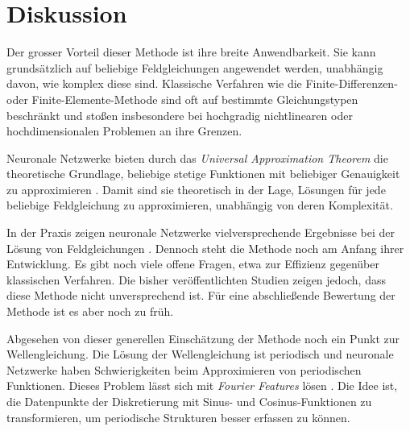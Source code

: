 %
%
%
%

\section{Diskussion\label{neuronal:section:diskussion}}

Der grosser Vorteil dieser Methode ist ihre breite Anwendbarkeit.
Sie kann grundsätzlich auf beliebige Feldgleichungen angewendet werden, unabhängig davon, wie komplex diese sind.
Klassische Verfahren wie die Finite-Differenzen- oder Finite-Elemente-Methode sind oft auf bestimmte Gleichungstypen beschränkt und stoßen insbesondere bei hochgradig nichtlinearen oder hochdimensionalen Problemen an ihre Grenzen.

Neuronale Netzwerke bieten durch das \emph{Universal Approximation Theorem} die theoretische Grundlage, beliebige stetige Funktionen mit beliebiger Genauigkeit zu approximieren \cite{neuronal:universal_approximation_theorem}. 
Damit sind sie theoretisch in der Lage, Lösungen für jede beliebige Feldgleichung zu approximieren, unabhängig von deren Komplexität.

In der Praxis zeigen neuronale Netzwerke vielversprechende Ergebnisse bei der Lösung von Feldgleichungen \cite{neuronal:pinns}. 
Dennoch steht die Methode noch am Anfang ihrer Entwicklung. 
Es gibt noch viele offene Fragen, etwa zur Effizienz gegenüber klassischen Verfahren.
Die bisher veröffentlichten Studien zeigen jedoch, dass diese Methode nicht unversprechend ist.
Für eine abschließende Bewertung der Methode ist es aber noch zu früh. 

Abgesehen von dieser generellen Einschätzung der Methode noch ein Punkt zur Wellengleichung.
Die Lösung der Wellengleichung ist periodisch und neuronale Netzwerke haben Schwierigkeiten beim Approximieren von periodischen Funktionen.
Dieses Problem lässt sich mit \emph{Fourier Features} lösen \cite{neuronal:fourier_features}.
Die Idee ist, die Datenpunkte der Diskretierung mit Sinus- und Cosinus-Funktionen zu transformieren, um periodische Strukturen besser erfassen zu können.

